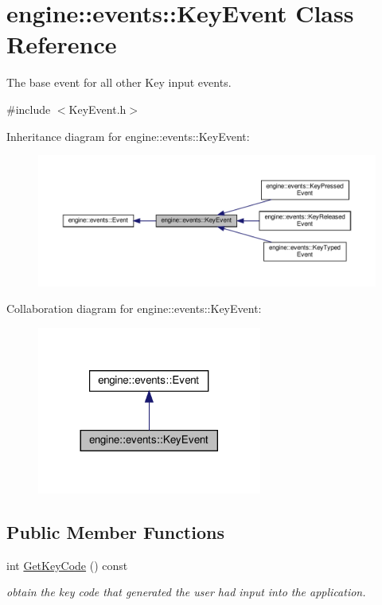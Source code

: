 \hypertarget{classengine_1_1events_1_1KeyEvent}{}\section{engine\+:\+:events\+:\+:Key\+Event Class Reference}
\label{classengine_1_1events_1_1KeyEvent}


The base event for all other Key input events.  




{\ttfamily \#include $<$Key\+Event.\+h$>$}



Inheritance diagram for engine\+:\+:events\+:\+:Key\+Event\+:
\nopagebreak
\begin{figure}[H]
\begin{center}
\leavevmode
\includegraphics[width=350pt]{classengine_1_1events_1_1KeyEvent__inherit__graph}
\end{center}
\end{figure}


Collaboration diagram for engine\+:\+:events\+:\+:Key\+Event\+:\nopagebreak
\begin{figure}[H]
\begin{center}
\leavevmode
\includegraphics[width=209pt]{classengine_1_1events_1_1KeyEvent__coll__graph}
\end{center}
\end{figure}
\subsection*{Public Member Functions}
\begin{DoxyCompactItemize}
\item 
int \hyperlink{classengine_1_1events_1_1KeyEvent_a2140c6615ec67c2f0cca0b1932968947}{Get\+Key\+Code} () const
\begin{DoxyCompactList}\small\item\em obtain the key code that generated the user had input into the application. \end{DoxyCompactList}\end{DoxyCompactItemize}
